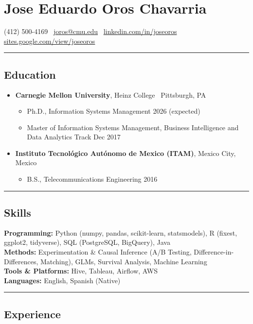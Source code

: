 \documentclass[10pt,letterpaper]{article}
\newcommand{\name}[1]{\section*{#1}}
\newcommand{\sep}{{\color{gray}\,\textbullet\,\,}}
\newcommand{\hsep}{\noindent\textcolor{gray}{\rule{\textwidth}{0.5pt}}}
\newcommand{\block}[1]{\begin{samepage}\hsep\subsection*{#1}\end{samepage}}
\begin{document}
\name{Jose Eduardo Oros Chavarria}

\begin{center}
(412) 500-4169 \sep \href{mailto:joros@cmu.edu}{joros@cmu.edu} \sep \href{https://www.linkedin.com/in/joseoros}{linkedin.com/in/joseoros} \sep \href{https://sites.google.com/view/joseoros}{sites.google.com/view/joseoros}
\end{center}

\block{Education}

\begin{itemize}[leftmargin=0pt, label={}, itemsep=4pt]
\item \textbf{Carnegie Mellon University}, Heinz College \sep Pittsburgh, PA
  \begin{itemize}[label={}]
  \item Ph.D., Information Systems Management \hfill 2026 (expected)
  \item Master of Information Systems Management, Business Intelligence and Data Analytics Track \hfill Dec 2017
  \end{itemize}
\item \textbf{Instituto Tecnol\'ogico Aut\'onomo de Mexico (ITAM)}, Mexico City, Mexico
  \begin{itemize}[label={}]
  \item B.S., Telecommunications Engineering \hfill 2016
  \end{itemize}
\end{itemize}

\block{Skills}

\noindent\textbf{Programming:} Python (numpy, pandas, scikit-learn, statsmodels), R (fixest, ggplot2, tidyverse), SQL (PostgreSQL, BigQuery), Java \\
\textbf{Methods:} Experimentation \& Causal Inference (A/B Testing, Difference-in-Differences, Matching), GLMs, Survival Analysis, Machine Learning \\
\textbf{Tools \& Platforms:} Hive, Tableau, Airflow, AWS \\
\textbf{Languages:} English, Spanish (Native)

\block{Experience}
\end{document}

